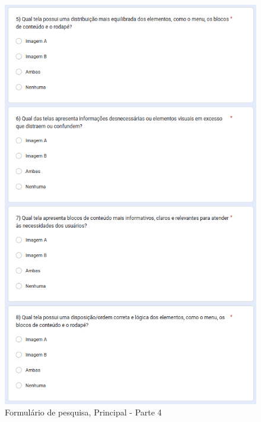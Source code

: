 \begin{figure}[!h]
	\begin{center}
	    \includegraphics[scale=0.6]{figs/Form/16.png}
	\end{center}
	\caption{\label{AP_PP04}Formulário de pesquisa, Principal - Parte 4}
\end{figure}

\newpage

